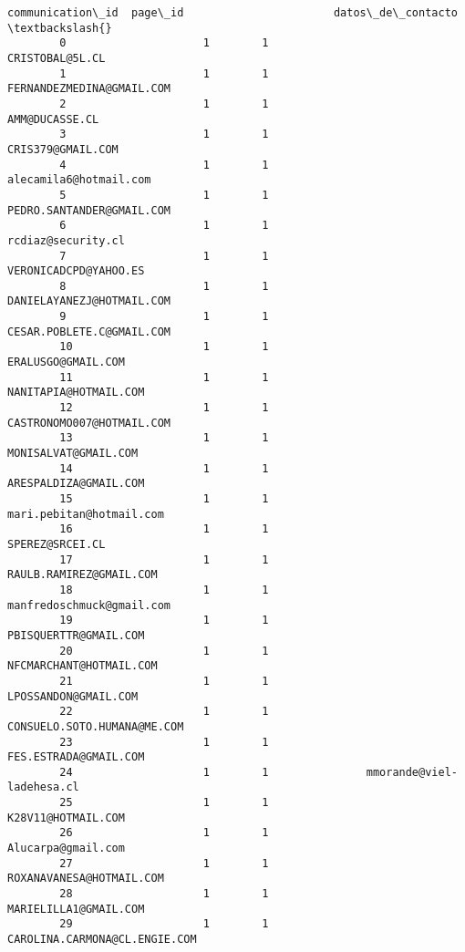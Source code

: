 \documentclass[11pt]{article}
\begin{document}
\begin{Verbatim}[commandchars=\\\{\}]
               communication\_id  page\_id                       datos\_de\_contacto  \textbackslash{}
        0                     1        1                         CRISTOBAL@5L.CL   
        1                     1        1               FERNANDEZMEDINA@GMAIL.COM   
        2                     1        1                          AMM@DUCASSE.CL   
        3                     1        1                       CRIS379@GMAIL.COM   
        4                     1        1                  alecamila6@hotmail.com   
        5                     1        1               PEDRO.SANTANDER@GMAIL.COM   
        6                     1        1                      rcdiaz@security.cl   
        7                     1        1                   VERONICADCPD@YAHOO.ES   
        8                     1        1               DANIELAYANEZJ@HOTMAIL.COM   
        9                     1        1               CESAR.POBLETE.C@GMAIL.COM   
        10                    1        1                      ERALUSGO@GMAIL.COM   
        11                    1        1                   NANITAPIA@HOTMAIL.COM   
        12                    1        1               CASTRONOMO007@HOTMAIL.COM   
        13                    1        1                    MONISALVAT@GMAIL.COM   
        14                    1        1                   ARESPALDIZA@GMAIL.COM   
        15                    1        1                mari.pebitan@hotmail.com   
        16                    1        1                         SPEREZ@SRCEI.CL   
        17                    1        1                 RAULB.RAMIREZ@GMAIL.COM   
        18                    1        1               manfredoschmuck@gmail.com   
        19                    1        1                   PBISQUERTTR@GMAIL.COM   
        20                    1        1                 NFCMARCHANT@HOTMAIL.COM   
        21                    1        1                    LPOSSANDON@GMAIL.COM   
        22                    1        1             CONSUELO.SOTO.HUMANA@ME.COM   
        23                    1        1                   FES.ESTRADA@GMAIL.COM   
        24                    1        1               mmorande@viel-ladehesa.cl   
        25                    1        1                      K28V11@HOTMAIL.COM   
        26                    1        1                      Alucarpa@gmail.com   
        27                    1        1                ROXANAVANESA@HOTMAIL.COM   
        28                    1        1                   MARIELILLA1@GMAIL.COM   
        29                    1        1           CAROLINA.CARMONA@CL.ENGIE.COM   

\end{Verbatim}
\end{document}
